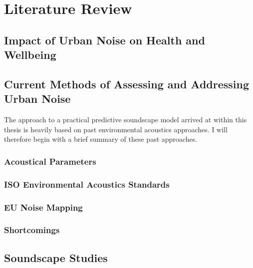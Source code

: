 \chapter{Literature Review}
\label{ch:lit}

\section{Impact of Urban Noise on Health and Wellbeing}



\section{Current Methods of Assessing and Addressing Urban Noise}

The approach to a practical predictive soundscape model arrived at within this thesis is heavily based on past environmental acoustics approaches. I will therefore begin with a brief summary of these past approaches.

\subsection{Acoustical Parameters}

\subsection{ISO Environmental Acoustics Standards}

\subsection{EU Noise Mapping}


\subsection{Shortcomings}


\section{Soundscape Studies}

